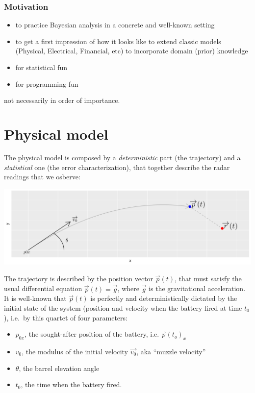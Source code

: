 \documentclass[]{article}
\providecommand{\tightlist}{%
  \setlength{\itemsep}{0pt}\setlength{\parskip}{0pt}}
\begin{document}
\hypertarget{motivation}{%
\subsubsection{Motivation}\label{motivation}}

\begin{itemize}
\tightlist
\item
  to practice Bayesian analysis in a concrete and well-known setting
\item
  to get a first impression of how it looks like to extend classic
  models (Physical, Electrical, Financial, etc) to incorporate domain
  (prior) knowledge
\item
  for statistical fun
\item
  for programming fun
\end{itemize}

not necessarily in order of importance.

\hypertarget{physical-model}{%
\section{Physical model}\label{physical-model}}

The physical model is composed by a \emph{deterministic} part (the
trajectory) and a \emph{statistical} one (the error characterization),
that together describe the radar readings that we osberve:

\includegraphics{static_images/physical_model_figure-1.png}

The trajectory is described by the position vector
\(\overrightarrow{p}(t)\), that must satisfy the usual differential
equation \(\ddot{\overrightarrow{p}}(t)=\overrightarrow{g}\), where
\(\overrightarrow{g}\) is the gravitational acceleration. It is
well-known that \(\overrightarrow{p}(t)\) is perfectly and
deterministically dictated by the initial state of the system (position
and velocity when the battery fired at time \(t_0\)), i.e.~by this
quartet of four parameters:

\begin{itemize}
\tightlist
\item
  \(p_{0x}\), the sought-after position of the battery, i.e.
  \(\overrightarrow{p}(t_o)_x\)
\item
  \(v_0\), the modulus of the initial velocity \(\overrightarrow{v_0}\),
  aka ``muzzle velocity''
\item
  \(\theta\), the barrel elevation angle
\item
  \(t_0\), the time when the battery fired.
\end{itemize}
\end{document}
